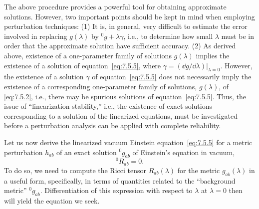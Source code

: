 The above procedure provides a powerful tool for obtaining approximate solutions.
However, two important points should be kept in mind when employing perturbation
techniques: (1) It is, in general, very difficult to estimate the error involved in
replacing \(g(\lambda)\) by \({}^{0}g+\lambda\gamma\), i.e., to determine how
small \(\lambda\) must be in order that the approximate solution have sufficient
accuracy. (2) As derived above, existence of a one-parameter family of solutions
\(g(\lambda)\) implies the existence of a solution of equation~\eqref{eq:7.5.5},
where \(\gamma=(\dd g/\dd\lambda)|_{\lambda=0}\). However, the existence of a
solution \(\gamma\) of equation~\eqref{eq:7.5.5} does not necessarily imply the
existence of a corresponding one-parameter family of solutions, \(g(\lambda)\), of
\eqref{eq:7.5.2}, i.e., there may be spurious solutions of
equation~\eqref{eq:7.5.5}. Thus, the issue of “linearization stability,” i.e., the
existence of exact solutions corresponding to a solution of the linearized equations,
must be investigated before a perturbation analysis can be applied with complete
reliability.

Let us now derive the linearized vacuum Einstein equation~\eqref{eq:7.5.5} for a
metric perturbation \(h_{ab}\) of an exact solution \({}^{0}g_{ab}\) of Einstein's
equation in vacuum,
\begin{equation}
  {}^{0}R_{ab}=0 .
  \tag{7.5.6}\label{eq:7.5.6}
\end{equation}
To do so, we need to compute the Ricci tensor \(R_{ab}(\lambda)\) for the metric
\(g_{ab}(\lambda)\) in a useful form, specifically, in terms of quantities related to
the “background metric” \({}^{0}g_{ab}\). Differentiation of this expression with
respect to \(\lambda\) at \(\lambda=0\) then will yield the equation we seek.

